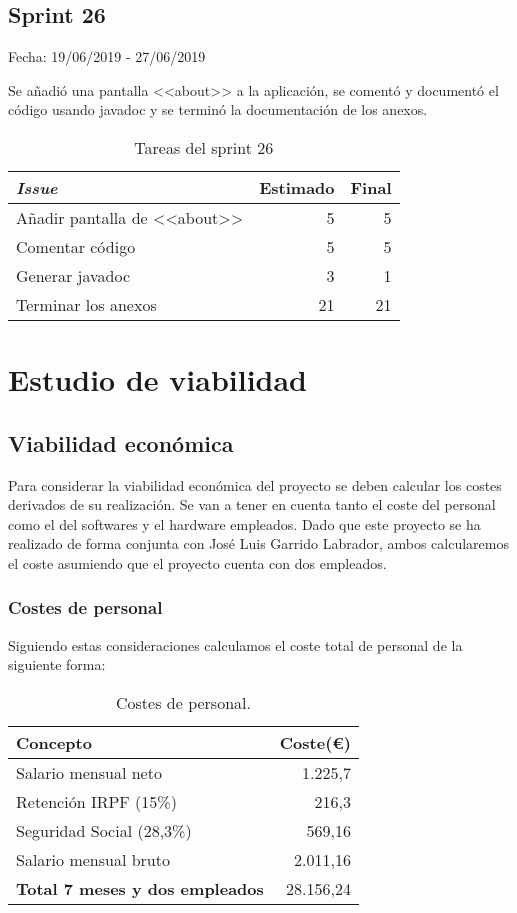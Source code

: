 \subsection{Sprint 26}

Fecha: 19/06/2019 - 27/06/2019

Se añadió una pantalla <<about>> a la aplicación, se comentó y documentó el código usando javadoc y se terminó la documentación de los anexos. 

\begin{table}[H]
	\begin{tabularx}{\textwidth}{Xrr}
		\toprule \textbf{\textit{Issue}} & \textbf{Estimado} & \textbf{Final}\\
		\toprule
		Añadir pantalla de <<about>> & 5 & 5 \\
		Comentar código & 5 & 5 \\
		Generar javadoc & 3 & 1 \\
		Terminar los anexos & 21 & 21 \\
		\bottomrule
	\end{tabularx}
	\caption{Tareas del sprint 26}
\end{table}

\section{Estudio de viabilidad}

\subsection{Viabilidad económica}

Para considerar la viabilidad económica del proyecto se deben calcular los costes derivados de su realización. Se van a tener en cuenta tanto el coste del personal como el del softwares y el hardware empleados. Dado que este proyecto se ha realizado de forma conjunta con José Luis Garrido Labrador, ambos calcularemos el coste asumiendo que el proyecto cuenta con dos empleados.

\subsubsection{Costes de personal} 

Siguiendo estas consideraciones calculamos el coste total de personal de la siguiente forma: 

\begin{table}[H]
	\centering
	\begin{tabular}[]{@{}l r@{}}
		\toprule
		\textbf{Concepto} & \textbf{Coste(\euro{})} \\
		\midrule
		Salario mensual neto~\cite{salariales} & 1.225,7 \\
		Retención IRPF (15\%) & 216,3 \\
		Seguridad Social (28,3\%) & 569,16 \\
		Salario mensual bruto & 2.011,16 \\\hubu
		\textbf{Total 7 meses y dos empleados} &  28.156,24 \\
		\bottomrule
	\end{tabular}
	\caption{Costes de personal.}
	\label{tab:costes_personal}
\end{table}


